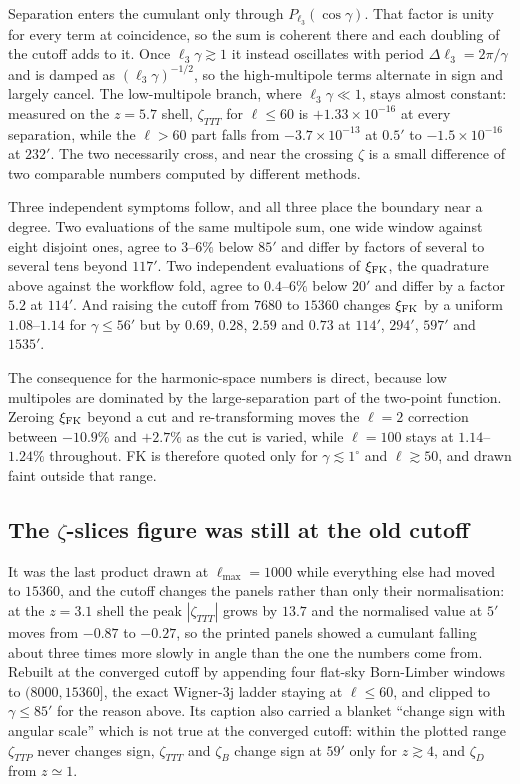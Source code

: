Separation enters the cumulant only through $P_{\ell_3}(\cos\gamma)$. That
factor is unity for every term at coincidence, so the sum is coherent there
and each doubling of the cutoff adds to it. Once $\ell_3\gamma\gtrsim1$ it
instead oscillates with period $\Delta\ell_3=2\pi/\gamma$ and is damped as
$(\ell_3\gamma)^{-1/2}$, so the high-multipole terms alternate in sign and
largely cancel. The low-multipole branch, where $\ell_3\gamma\ll1$, stays
almost constant: measured on the $z=5.7$ shell, $\zeta_{TTT}$ for $\ell\le60$
is $+1.33\times10^{-16}$ at every separation, while the $\ell>60$ part falls
from $-3.7\times10^{-13}$ at $0.5'$ to $-1.5\times10^{-16}$ at $232'$. The two
necessarily cross, and near the crossing $\zeta$ is a small difference of two
comparable numbers computed by different methods.

Three independent symptoms follow, and all three place the boundary near a
degree. Two evaluations of the same multipole sum, one wide window against
eight disjoint ones, agree to $3$--$6\%$ below $85'$ and differ by factors of
several to several tens beyond $117'$. Two independent evaluations of
$\xi_{\rm FK}$, the quadrature above against the workflow fold, agree to
$0.4$--$6\%$ below $20'$ and differ by a factor $5.2$ at $114'$. And raising
the cutoff from $7680$ to $15360$ changes $\xi_{\rm FK}$ by a uniform
$1.08$--$1.14$ for $\gamma\le56'$ but by $0.69$, $0.28$, $2.59$ and $0.73$ at
$114'$, $294'$, $597'$ and $1535'$.

The consequence for the harmonic-space numbers is direct, because low
multipoles are dominated by the large-separation part of the two-point
function. Zeroing $\xi_{\rm FK}$ beyond a cut and re-transforming moves the
$\ell=2$ correction between $-10.9\%$ and $+2.7\%$ as the cut is varied, while
$\ell=100$ stays at $1.14$--$1.24\%$ throughout. FK is therefore quoted only
for $\gamma\lesssim1^\circ$ and $\ell\gtrsim50$, and drawn faint outside that
range.

\subsection{The $\zeta$-slices figure was still at the old cutoff}

It was the last product drawn at $\ell_{\max}=1000$ while everything else had
moved to $15360$, and the cutoff changes the panels rather than only their
normalisation: at the $z=3.1$ shell the peak $|\zeta_{TTT}|$ grows by $13.7$
and the normalised value at $5'$ moves from $-0.87$ to $-0.27$, so the printed
panels showed a cumulant falling about three times more slowly in angle than
the one the numbers come from. Rebuilt at the converged cutoff by appending
four flat-sky Born-Limber windows to $(8000,15360]$, the exact Wigner-3j ladder
staying at $\ell\le60$, and clipped to $\gamma\le85'$ for the reason above.
Its caption also carried a blanket ``change sign with angular scale'' which is
not true at the converged cutoff: within the plotted range $\zeta_{TTP}$ never
changes sign, $\zeta_{TTT}$ and $\zeta_{B}$ change sign at $59'$ only for
$z\gtrsim4$, and $\zeta_{D}$ from $z\simeq1$.
